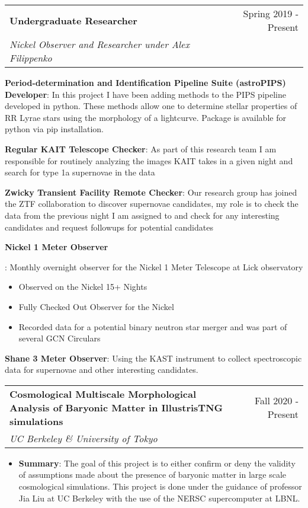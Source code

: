 \documentclass[letterpaper,10pt]{article}
\makeatletter
\newcommand{\resumeItem}[2]{
  \item\small{
    \textbf{#1}{: #2 \vspace{-3pt}}
  }
}
\newcommand{\resumeSubheading}[4]{
  \vspace{-1pt}\item[]
  \begin{tabular*}{0.98\textwidth}{l@{\extracolsep{\fill}}r}
      \hspace{-10pt}\textbf{#1} & #2 \\
      \hspace{-10pt}\textit{\small#3} & \textit{\small #4} \\
    \end{tabular*}\vspace{-3pt}
}
\newcommand{\resumeItemListStart}{\begin{itemize}}
\newcommand{\resumeItemListEnd}{\end{itemize}\vspace{-3pt}}
\makeatother
\begin{document}
    \resumeSubheading
      {Undergraduate Researcher}{Spring 2019 - Present}
      {Nickel Observer and Researcher under Alex Filippenko}{}
      \resumeItemListStart
        \resumeItem{Period-determination and Identification Pipeline Suite (astroPIPS) Developer}{In this project I have been adding methods to the PIPS pipeline developed in python. These methods allow one to determine stellar properties of RR Lyrae stars using the morphology of a lightcurve. Package is available for python via pip installation.}
        \resumeItem{Regular KAIT Telescope Checker}
          {As part of this research team I am responsible for routinely analyzing the images KAIT takes in a given night and search for type 1a supernovae in the data}
        \resumeItem{Zwicky Transient Facility Remote Checker}
            {Our research group has joined the ZTF collaboration to discover supernovae candidates, my role is to check the data from the previous night I am assigned to and check for any interesting candidates and request followups for potential candidates}
        \resumeItem{Nickel 1 Meter Observer}
          {Monthly overnight observer for the Nickel 1 Meter Telescope at Lick observatory
            \begin{itemize}
                \item Observed on the Nickel 15+ Nights
                \item Fully Checked Out Observer for the Nickel
                \item Recorded data for a potential binary neutron star merger and was part of several GCN Circulars
            \end{itemize}
        \resumeItem{Shane 3 Meter Observer}
            {Using the KAST instrument to collect spectroscopic data for supernovae and other interesting candidates.}
          }
      \resumeItemListEnd
      \vspace{4pt}
      \resumeSubheading
        {Cosmological Multiscale Morphological Analysis of Baryonic Matter in IllustrisTNG simulations}{Fall 2020 - Present}{UC Berkeley \& University of Tokyo}{}
        \resumeItemListStart
            \resumeItem{Summary}
                {The goal of this project is to either confirm or deny the validity of assumptions made about the presence of baryonic matter in large scale cosmological simulations. This project is done under the guidance of professor Jia Liu at UC Berkeley with the use of the NERSC supercomputer at LBNL.}
        \resumeItemListEnd
     \vspace{4pt}   
     \resumeSubheading
\end{document}
